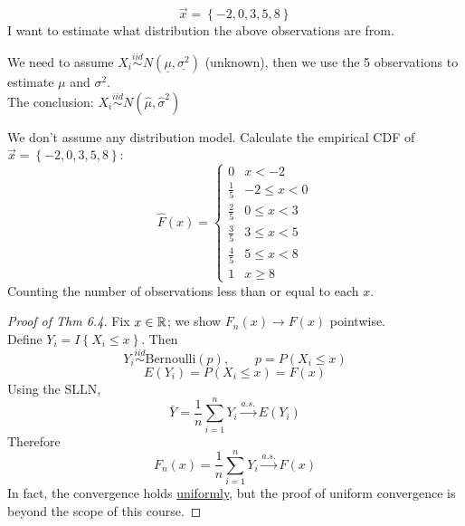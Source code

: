 \begin{example}[][6.4.1]
    \[\vec{x} = \left\{-2, 0, 3, 5, 8\right\}\]
    I want to estimate what distribution the above observations are from.

    We need to assume $X_i \overset{iid}{\sim} N(\underline{\mu}, \underline{\sigma^2})$ (unknown), then we use the 5 observations to estimate $\mu$ and $\sigma^2$.
    \\The conclusion: $X_i \overset{iid}{\sim} N(\hat{\mu}, \hat{\sigma}^2)$

    We don't assume any distribution model. Calculate the empirical CDF of $\vec{x} = \left\{-2, 0, 3, 5, 8\right\}$:
    \[\hat{F}(x) = \begin{cases}
        0 & x < -2\\
        \frac15 & -2 \leq x < 0\\
        \frac25 & 0 \leq x < 3\\
        \frac35 & 3 \leq x < 5\\
        \frac45 & 5 \leq x < 8\\
        1 & x \geq 8
    \end{cases}\]
    Counting the number of observations less than or equal to each $x$.
\end{example}

\begin{proof}[Proof of Thm 6.4]
    Fix $x \in \mathbb{R}$; we show $F_n(x) \to F(x)$ pointwise.
    \\Define $Y_i = I\left\{X_i \leq x\right\}$. Then
    \[Y_i \overset{iid}{\sim} \text{Bernoulli}(p), \qquad p = P(X_i \leq x)\]
    \[E(Y_i) = P(X_i \leq x) = F(x)\]
    Using the SLLN,
    \[\bar{Y} = \frac{1}{n}\sum_{i=1}^n Y_i \overset{a.s.}{\longrightarrow} E(Y_i)\]
    Therefore
    \[F_n(x) = \frac{1}{n}\sum_{i=1}^n Y_i \overset{a.s.}{\longrightarrow} F(x)\]
    In fact, the convergence holds \underline{uniformly}, but the proof of uniform convergence is beyond the scope of this course.
\end{proof}
